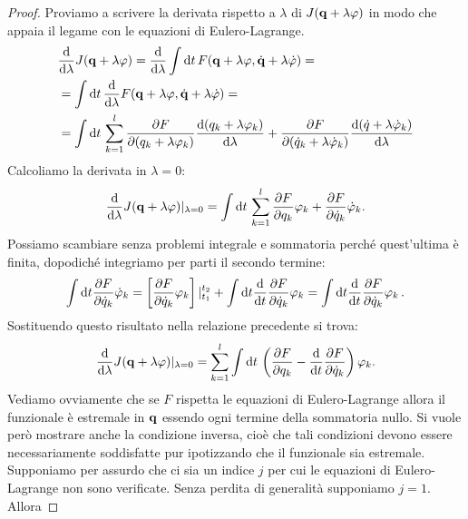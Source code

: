     \begin{proof}
        Proviamo a scrivere la derivata rispetto a $\lambda$ di $J(\mathbf{q}+\lambda\mathbf{\varphi})$ in modo che appaia il legame con le equazioni di Eulero-Lagrange.
        \begin{equation}
            \begin{aligned}
                &\frac{\mathrm{d}}{\mathrm{d} \lambda} J(\mathbf{q}+\lambda\mathbf{\varphi}) = \frac{\mathrm{d}}{\mathrm{d} \lambda} \int \mathrm{d} t\,F(\mathbf{q}+\lambda \varphi, \dot{\mathbf{q}} + \lambda \dot{\varphi})=\\
                &= \int \mathrm{d} t\,\frac{\mathrm{d}}{\mathrm{d} \lambda}F(\mathbf{q}+\lambda \varphi, \dot{\mathbf{q}} + \lambda \dot{\varphi}) =\\
                &=\int \mathrm{d} t\, \sum_{k=1}^l \frac{\partial F}{\partial (q_k+\lambda \varphi_k)} \frac{\mathrm{d}(q_k+\lambda \varphi_k)}{\mathrm{d} \lambda} + \frac{\partial F}{\partial (\dot{q}_k + \lambda \dot{\varphi}_k)}\frac{\mathrm{d}(\dot{q}+\lambda \dot{\varphi}_k)}{\mathrm{d} \lambda}
            \end{aligned}
        \end{equation}
        Calcoliamo la derivata in $\lambda =0$:
        \begin{equation}
            \frac{\mathrm{d}}{\mathrm{d} \lambda} J(\mathbf{q}+\lambda\mathbf{\varphi})|_{\lambda=0} =\int \mathrm{d} t\, \sum_{k=1}^l \frac{\partial F}{\partial q_k} \varphi_k + \frac{\partial F}{\partial \dot{q}_k}\dot{\varphi}_k.
        \end{equation}
        Possiamo scambiare senza problemi integrale e sommatoria perché quest'ultima è finita, dopodiché integriamo per parti il secondo termine:
        \begin{equation}
            \int \mathrm{d} t\frac{\partial F}{\partial \dot{q}_k}\dot{\varphi}_k = \left[\frac{\partial F}{\partial \dot{q}_k}\varphi_k\right]|_{t_1}^{t_2} + \int \mathrm{d} t \frac{\mathrm{d}}{\mathrm{d}t} \frac{\partial F}{\partial \dot{q}_k}\varphi_k=\int \mathrm{d} t \frac{\mathrm{d}}{\mathrm{d}t} \frac{\partial F}{\partial \dot{q}_k}\varphi_k\,.
        \end{equation}
    Sostituendo questo risultato nella relazione precedente si trova: 
    \begin{equation}
         \frac{\mathrm{d}}{\mathrm{d} \lambda} J(\mathbf{q}+\lambda\mathbf{\varphi})|_{\lambda=0} = \sum_{k=1}^l \int\mathrm{d} t\,\left(\frac{\partial F}{\partial q_k}- \frac{\mathrm{d}}{\mathrm{d}t} \frac{\partial F}{\partial \dot{q}_k}\right)\varphi_k .
    \end{equation}
    Vediamo ovviamente che se $F$ rispetta le equazioni di Eulero-Lagrange allora il funzionale è estremale in $\mathbf{q}$ essendo ogni termine della sommatoria nullo. Si vuole però mostrare anche la condizione inversa, cioè che tali condizioni devono essere necessariamente soddisfatte pur ipotizzando che il funzionale sia estremale. Supponiamo per assurdo che ci sia un indice $j$ per cui le equazioni di Eulero-Lagrange non sono verificate. Senza perdita di generalità supponiamo $j=1$. Allora

\end{proof}
